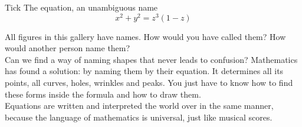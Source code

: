 \begin{surferPage}{Tick}
The equation, an unambiguous name \\
\smallskip
\[x^2 + y^2	= z^3	(1 - z) \]


\singlespacing
All figures in this gallery have names. How would you have called them? How would another person name them?\\
\vspace{0.3cm}
Can we find a way of naming shapes that never leads to confusion? Mathematics has found a solution: by naming them by their equation. It determines all its points, all curves, holes, wrinkles and peaks. You just have to know how to find these forms inside the formula and how to draw them.\\
\vspace{0.3cm}
Equations are written and interpreted the world over in the same manner, because the language of mathematics is universal, just like musical scores.
\end{surferPage}
